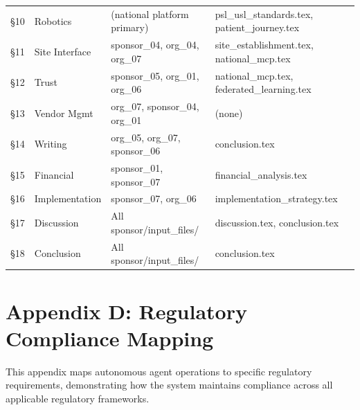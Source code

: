 \begin{longtable}{L{1.5cm} L{3.0cm} L{3.5cm} L{3.5cm}}
\S10 & Robotics & (national platform primary) & psl\_usl\_standards.tex, patient\_journey.tex \\
\S11 & Site Interface & sponsor\_04, org\_04, org\_07 & site\_establishment.tex, national\_mcp.tex \\
\S12 & Trust & sponsor\_05, org\_01, org\_06 & national\_mcp.tex, federated\_learning.tex \\
\S13 & Vendor Mgmt & org\_07, sponsor\_04, org\_01 & (none) \\
\S14 & Writing & org\_05, org\_07, sponsor\_06 & conclusion.tex \\
\S15 & Financial & sponsor\_01, sponsor\_07 & financial\_analysis.tex \\
\S16 & Implementation & sponsor\_07, org\_06 & implementation\_strategy.tex \\
\S17 & Discussion & All sponsor/input\_files/ & discussion.tex, conclusion.tex \\
\S18 & Conclusion & All sponsor/input\_files/ & conclusion.tex \\
\end{longtable}

\section*{Appendix D: Regulatory Compliance Mapping}

This appendix maps autonomous agent operations to specific regulatory requirements,
demonstrating how the system maintains compliance across all applicable regulatory
frameworks.

